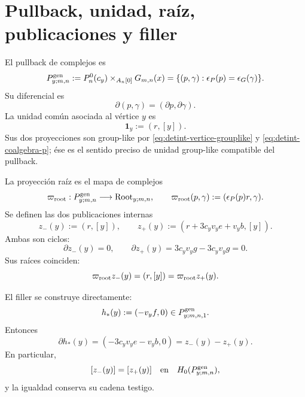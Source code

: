 \section{Pullback, unidad, raíz, publicaciones y filler}

El pullback de complejos es
\begin{equation}\label{eq:detint-pgen}
 P^{\rm gen}_{y;m,n}
 :=P_n^0(c_y)\times_{A_n[0]}G_{m,n}(x)
 =\{(p,\gamma):\epsilon_P(p)=\epsilon_G(\gamma)\}.
\end{equation}
Su diferencial es
\begin{equation}\label{eq:detint-pgen-d}
 \partial(p,\gamma)=(\partial p,\partial\gamma).
\end{equation}
La unidad común asociada al vértice \(y\) es
\begin{equation}\label{eq:detint-unidad}
 \mathbf1_y:=(r,[y]).
\end{equation}
Sus dos proyecciones son group-like por
\eqref{eq:detint-vertice-grouplike} y
\eqref{eq:detint-coalgebra-p}; ése es el sentido preciso de unidad
group-like compatible del pullback.

La proyección raíz es el mapa de complejos
\begin{equation}\label{eq:detint-proyeccion-root}
 \varpi_{\rm root}:P^{\rm gen}_{y;m,n}\longrightarrow
 \operatorname{Root}_{y;m,n},
 \qquad
 \varpi_{\rm root}(p,\gamma):=(\epsilon_P(p)r,\gamma).
\end{equation}
Se definen las dos publicaciones internas
\begin{equation}\label{eq:detint-zpm}
 z_-(y):=(r,[y]),
 \qquad
 z_+(y):=(r+3c_yv_ye+v_yb,[y]).
\end{equation}
Ambas son ciclos:
\begin{equation}\label{eq:detint-zpm-ciclos}
 \partial z_-(y)=0,
 \qquad
 \partial z_+(y)=3c_yv_yg-3c_yv_yg=0.
\end{equation}
Sus raíces coinciden:
\begin{equation}\label{eq:detint-raiz-comun}
 \varpi_{\rm root}z_-(y)
 =(r,[y])
 =\varpi_{\rm root}z_+(y).
\end{equation}

El filler se construye directamente:
\begin{equation}\label{eq:detint-hstar}
 h_*(y):=(-v_yf,0)\in P^{\rm gen}_{y;m,n,1}.
\end{equation}
Entonces
\begin{equation}\label{eq:detint-filler-identidad}
 \partial h_*(y)
 =(-3c_yv_ye-v_yb,0)
 =z_-(y)-z_+(y).
\end{equation}
En particular,
\begin{equation}\label{eq:detint-clases-iguales}
 [z_-(y)]=[z_+(y)]
 \quad\text{en}\quad H_0(P^{\rm gen}_{y;m,n}),
\end{equation}
y la igualdad conserva su cadena testigo.

